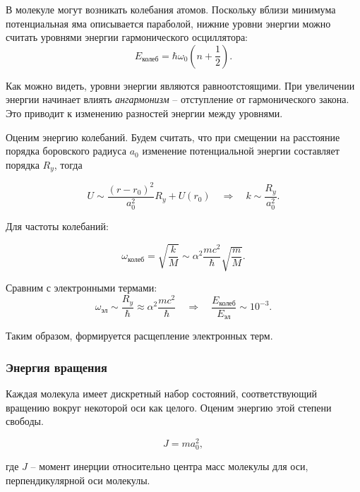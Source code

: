 \documentclass[a4paper, 12pt]{article}
\begin{document}
    В молекуле могут возникать колебания атомов. Поскольку вблизи минимума потенциальная яма описывается параболой, нижние уровни энергии можно считать уровнями энергии гармонического осциллятора:
    \begin{equation}
        E_{\text{колеб}} = \hbar \omega_0 (n + \frac{1}{2}).
    \end{equation}

    Как можно видеть, уровни энергии являются равноотстоящими. При увеличении энергии начинает влиять \textit{ангармонизм} -- отступление от гармонического закона. Это приводит к изменению разностей энергии между уровнями.

    Оценим энергию колебаний. Будем считать, что при смещении на расстояние порядка боровского радиуса $a_0$ изменение потенциальной энергии составляет порядка $R_y$, тогда
    
    \begin{equation}
        U \sim \frac{(r - r_0)^2}{a_0^2} R_y + U(r_0) \quad \Rightarrow \quad k \sim \frac{R_y}{a_0^2}.
    \end{equation}
    
    Для частоты колебаний:
    
    \begin{equation}
        \omega_{\text{колеб}} = \sqrt{\frac{k}{M}} \sim \alpha^2 \frac{mc^2}{\hbar} \sqrt{\frac{m}{M}}.
    \end{equation}

    Сравним с электронными термами:
    \begin{equation}
        \omega_{\text{эл}} \sim \frac{R_y}{\hbar} \approx \alpha^2 \frac{mc^2}{\hbar} \quad \Rightarrow \quad \frac{E_{\text{колеб}}}{E_{\text{эл}}} \sim 10^{-3}.
    \end{equation}

    Таким образом, формируется расщепление электронных терм.

    \subsubsection{Энергия вращения}

    Каждая молекула имеет дискретный набор состояний, соответствующий вращению вокруг некоторой оси как целого. Оценим энергию этой степени свободы.

    \begin{equation}
        J = ma_0^2,
    \end{equation}

    где $J$ -- момент инерции относительно центра масс молекулы для оси, перпендикулярной оси молекулы.
    
\end{document}
